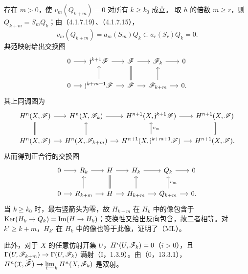 存在 $m>0$，使 $v_m(Q_{k+m})=0$ 对所有 $k\ge k_0$ 成立。
\eproof
取 $h$ 的倍数 $m\ge r$，则 $Q_{k+m}=S_mQ_k$；由（4.1.7.19）、（4.1.7.15），
\[
v_m(Q_{k+m})=a_m(S_m)Q_k\subset a_r(S_r)Q_k=0.
\]
\finishproof
{}
典范映射给出交换图
\[
\begin{tikzcd}[column sep=small]
0\arrow[r]&\frj^{k+1}\F\arrow[r]&\F\arrow[r]&\F_k\arrow[r]&0\\
0\arrow[r]&\frj^{k+m+1}\F\arrow[r]\arrow[u]&\F\arrow[r]\arrow[u,equal]&\F_{k+m}\arrow[r]\arrow[u]&0.
\end{tikzcd}
\]
其上同调图为
\[
\begin{tikzcd}[column sep=small]
H^n(X,\F)\arrow[r]&H^n(X,\F_k)\arrow[r]&H^{n+1}(X,\frj^{k+1}\F)\arrow[r]&H^{n+1}(X,\F)\\
H^n(X,\F)\arrow[r]\arrow[u,equal]&H^n(X,\F_{k+m})\arrow[r]\arrow[u]&H^{n+1}(X,\frj^{k+m+1}\F)\arrow[r]\arrow[u,"v_m"']&H^{n+1}(X,\F)\arrow[u,equal].
\end{tikzcd}
\]
从而得到正合行的交换图
\[
\begin{tikzcd}[column sep=small]
0\arrow[r]&R_k\arrow[r]&H\arrow[r]&H_k\arrow[r]&Q_k\arrow[r]&0\\
0\arrow[r]&R_{k+m}\arrow[r]\arrow[u]&H\arrow[r]\arrow[u,equal]&H_{k+m}\arrow[r]\arrow[u]&Q_{k+m}\arrow[r]\arrow[u,"v_m"']&0.
\end{tikzcd}
\]
当 $k\ge k_0$ 时，最右竖箭头为零，故 $H_{k+m}$ 在 $H_k$ 中的像包含于 $\operatorname{Ker}(H_k\to Q_k)=\operatorname{Im}(H\to H_k)$；交换性又给出反向包含，故二者相等。对 $k'\ge k+m$，$H_{k'}$ 在 $H_k$ 中的像也等于此像，证明了（ML）。

此外，对于 $X$ 的任意仿射开集 $U$，$H^i(U,\mathscr F_k)=0$（$i>0$），且 $\Gamma(U,\mathscr F_{k+m})\to\Gamma(U,\mathscr F_k)$ 满射（I，1.3.9）。由（0，13.3.1），$H^n(\mathfrak X,\widehat{\mathscr F})\to\varprojlim_kH^n(X,\mathscr F_k)$ 是双射。

